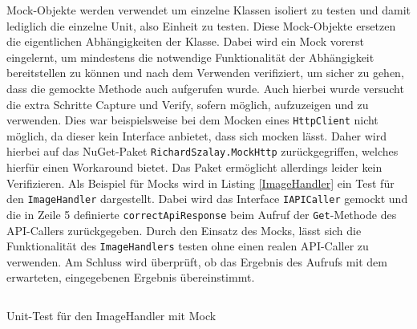Mock-Objekte werden verwendet um einzelne Klassen isoliert zu testen und damit lediglich die einzelne Unit, also Einheit zu testen. Diese Mock-Objekte ersetzen die eigentlichen Abhängigkeiten der Klasse. Dabei wird ein Mock vorerst eingelernt, um mindestens die notwendige Funktionalität der Abhängigkeit bereitstellen zu können und nach dem Verwenden verifiziert, um sicher zu gehen, dass die gemockte Methode auch aufgerufen wurde. Auch hierbei wurde versucht die extra Schritte Capture und Verify, sofern möglich, aufzuzeigen und zu verwenden. Dies war beispielsweise bei dem Mocken eines \texttt{HttpClient} nicht möglich, da dieser kein Interface anbietet, dass sich mocken lässt. Daher wird hierbei auf das NuGet-Paket \texttt{RichardSzalay.MockHttp} zurückgegriffen, welches hierfür einen Workaround bietet. Das Paket ermöglicht allerdings leider kein Verifizieren. Als Beispiel für Mocks wird in Listing \ref{ImageHandler} ein Test für den \texttt{ImageHandler} dargestellt. Dabei wird das Interface \texttt{IAPICaller} gemockt und die in Zeile 5 definierte \texttt{correctApiResponse} beim Aufruf der \texttt{Get}-Methode des API-Callers zurückgegeben. Durch den Einsatz des Mocks, lässt sich die Funktionalität des \texttt{ImageHandlers} testen ohne einen realen API-Caller zu verwenden. Am Schluss wird überprüft, ob das Ergebnis des Aufrufs mit dem erwarteten, eingegebenen Ergebnis übereinstimmt.

\begin{listing}[h]
\inputminted[linenos=true,frame=lines]{csharp}{Listings/ImageHandlerTest.cs}
\caption{Unit-Test für den ImageHandler mit Mock}
\label{ImageHandler}
\end{listing}

